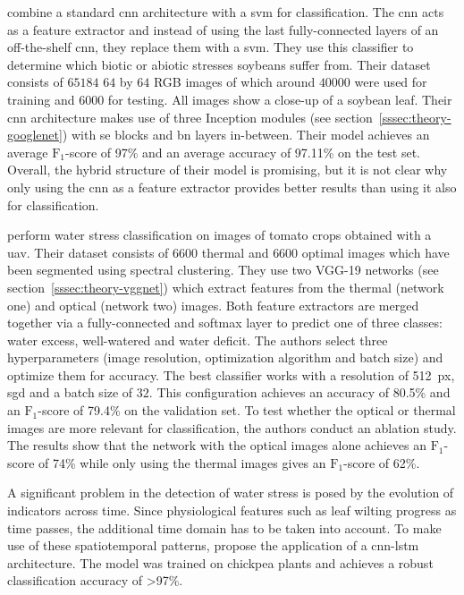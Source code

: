 \documentclass[final]{vutinfth} %
\begin{document}
\textcite{venal2019} combine a standard \gls{cnn} architecture with a
\gls{svm} for classification. The \gls{cnn} acts as a feature
extractor and instead of using the last fully-connected layers of an
off-the-shelf \gls{cnn}, they replace them with a \gls{svm}. They use
this classifier to determine which biotic or abiotic stresses soybeans
suffer from. Their dataset consists of $65184$ $64$ by $64$ RGB
images of which around $40000$ were used for training and $6000$ for
testing. All images show a close-up of a soybean leaf. Their \gls{cnn}
architecture makes use of three Inception modules (see
section~\ref{sssec:theory-googlenet}) with \gls{se} blocks and
\gls{bn} layers in-between. Their model achieves an average
$\mathrm{F}_1$-score of 97\% and an average accuracy of 97.11\% on the
test set. Overall, the hybrid structure of their model is promising,
but it is not clear why only using the \gls{cnn} as a feature
extractor provides better results than using it also for
classification.

\textcite{aversano2022} perform water stress classification on images
of tomato crops obtained with a \gls{uav}. Their dataset consists of
$6600$ thermal and $6600$ optimal images which have been segmented
using spectral clustering. They use two VGG-19 networks (see
section~\ref{sssec:theory-vggnet}) which extract features from the
thermal (network one) and optical (network two) images. Both feature
extractors are merged together via a fully-connected and softmax layer
to predict one of three classes: water excess, well-watered and water
deficit. The authors select three hyperparameters (image resolution,
optimization algorithm and batch size) and optimize them for
accuracy. The best classifier works with a resolution of
\qty{512}{px}, \gls{sgd} and a batch size of $32$. This configuration
achieves an accuracy of 80.5\% and an $\mathrm{F}_1$-score of 79.4\%
on the validation set. To test whether the optical or thermal images
are more relevant for classification, the authors conduct an ablation
study. The results show that the network with the optical images alone
achieves an $\mathrm{F}_1$-score of 74\% while only using the thermal
images gives an $\mathrm{F}_1$-score of 62\%.

A significant problem in the detection of water stress is posed by the
evolution of indicators across time. Since physiological features such
as leaf wilting progress as time passes, the additional time domain
has to be taken into account. To make use of these spatiotemporal
patterns, \textcite{azimi2021} propose the application of a
\gls{cnn-lstm} architecture. The model was trained on chickpea plants
and achieves a robust classification accuracy of >97\%.
\end{document}
